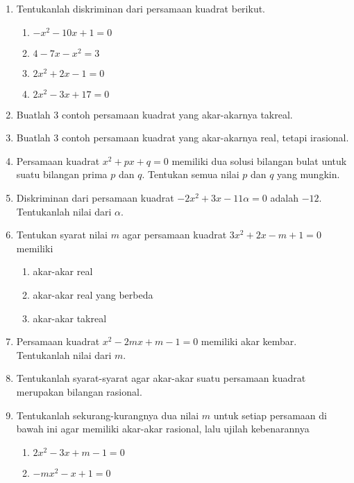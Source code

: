 \begin{enumerate}[nosep]
			\item Tentukanlah diskriminan dari persamaan kuadrat berikut.
			\begin{multcols}
				\begin{enumerate}
					\item $ -x^{2} - 10x + 1 = 0 $
					\item $ 4 - 7x - x^{2} = 3 $
					\item $ 2x^{2} + 2x - 1 = 0 $
					\item $ 2x^{2} - 3x + 17 = 0 $
				\end{enumerate}
			\end{multcols}
			\item Buatlah 3 contoh persamaan kuadrat yang akar-akarnya takreal.
			\item Buatlah 3 contoh persamaan kuadrat yang akar-akarnya real, tetapi irasional.
			\item Persamaan kuadrat $ x^{2} + px + q = 0 $ memiliki dua solusi bilangan bulat untuk suatu bilangan prima $ p $ dan $ q $. Tentukan semua nilai $ p $ dan $ q $ yang mungkin.
			\item Diskriminan dari persamaan kuadrat $ -2x^{2} + 3x - 11\alpha = 0 $ adalah $ -12 $. Tentukanlah nilai dari $ \alpha $.
			\item Tentukan syarat nilai $ m $ agar persamaan kuadrat $ 3x^{2} + 2x - m + 1 = 0 $ memiliki
			\begin{multcols}
				\begin{enumerate}
					\item akar-akar real
					\item akar-akar real yang berbeda
					\item akar-akar takreal
				\end{enumerate}
			\end{multcols}
			\item Persamaan kuadrat $ x^{2} - 2mx + m - 1 = 0 $ memiliki akar kembar. Tentukanlah nilai dari $ m $.
			\item {} Tentukanlah syarat-syarat agar akar-akar suatu persamaan kuadrat merupakan bilangan rasional.
			\item Tentukanlah sekurang-kurangnya dua nilai $ m $ untuk setiap persamaan di bawah ini agar memiliki akar-akar rasional, lalu ujilah kebenarannya
			\begin{multcols}
				\begin{enumerate}
					\item $ 2x^{2} - 3x + m - 1 = 0 $
					\item $ -mx^{2} - x + 1 = 0 $

\end{enumerate}
\end{multcols}
\end{enumerate}
